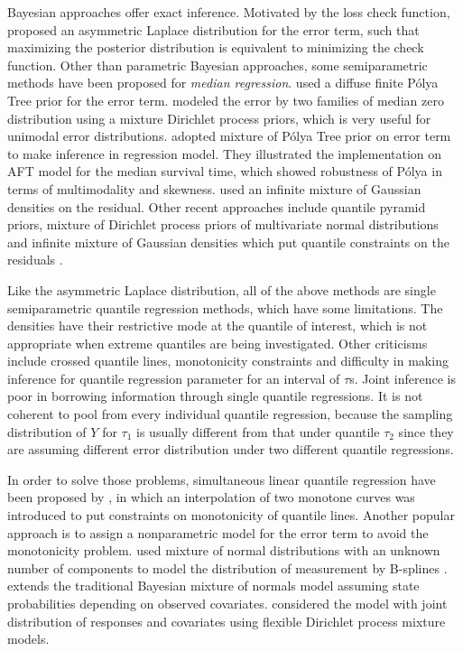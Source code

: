 \documentclass[12pt]{article}
\newcommand{\polya}{P\'{o}lya}
\begin{document}
Bayesian approaches offer exact inference. Motivated by the loss check
function, \citet{yu2001} proposed an asymmetric Laplace distribution
for the error term, such that maximizing the posterior distribution is
equivalent to minimizing the check function. Other than parametric
Bayesian approaches, some semiparametric methods have been proposed
for {\em median regression}. \citet{walker1999} used a diffuse finite
\polya{} Tree prior for the error term. \citet{kottas2001} modeled the
error by two families of median zero distribution using a mixture
Dirichlet process priors, which is very useful for unimodal error
distributions. \citet{hanson2002} adopted mixture of \polya{} Tree
prior on error term to make inference in regression model. They
illustrated the implementation on AFT model for the median survival
time, which showed robustness of \polya{} in terms of multimodality
and skewness.  \citet{reich2010} used an infinite mixture of Gaussian
densities on the residual.  Other recent approaches include quantile
pyramid priors, mixture of Dirichlet process priors of multivariate
normal distributions and infinite mixture of Gaussian densities which
put quantile constraints on the residuals \citep{hjort2007,hjort2009,
  kottas2009}.

Like the asymmetric Laplace distribution, all of the above methods are
single semiparametric quantile regression methods, which have some
limitations. The densities have their restrictive mode at the quantile
of interest, which is not appropriate when extreme quantiles are being
investigated. Other criticisms include crossed quantile lines,
monotonicity constraints and difficulty in making inference for
quantile regression parameter for an interval of $\tau$s. Joint
inference is poor in borrowing information through single quantile
regressions. It is not coherent to pool from every individual quantile
regression, because the sampling distribution of $Y$ for $\tau_1$ is
usually different from that under quantile $\tau_2$ since they are
assuming different error distribution under two different quantile
regressions.

In order to solve those problems, simultaneous linear quantile
regression have been proposed by \citet{tokdar2011},
in which an interpolation of two monotone curves was introduced to put constraints on monotonicity of quantile lines.
Another popular approach is to assign a nonparametric model for the error term to
avoid the monotonicity problem.
\citep{scaccia2003} used mixture of normal distributions with an unknown number of components to model the distribution of measurement by B-splines .
\citep{geweke2007} extends the traditional Bayesian mixture of normals model assuming state probabilities depending on observed covariates.
\citep{taddy2010} considered the model with joint distribution of responses and covariates using flexible Dirichlet process mixture models.
\end{document}
